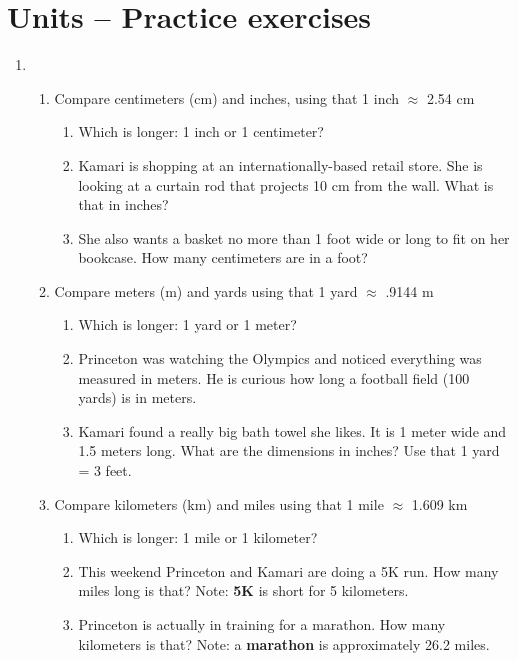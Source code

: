 
\section{Units  -- Practice exercises}

\begin{enumerate}
\item  
\begin{enumerate}

\item Compare centimeters (cm) and inches, using that 1 inch $\approx$ 2.54 cm
\begin{enumerate}
\item Which is longer:  1 inch or 1 centimeter? \vfill
\item Kamari is shopping at an internationally-based retail store. She is looking at a curtain rod that projects 10 cm from the wall.  What is that in inches?  \vfill
\item She also wants a basket no more than 1 foot wide or long to fit on her bookcase.  How many centimeters are in a foot? \vfill
\end{enumerate}

\item Compare meters (m) and yards using that 1 yard $\approx$ .9144 m
\begin{enumerate}
\item Which is longer: 1 yard or 1 meter? \vfill
\item Princeton was watching the Olympics and noticed everything was measured in meters.  He is curious how long a football field (100 yards) is in meters.  \vfill
\item Kamari found a really big bath towel she likes. It is 1 meter wide and 1.5 meters long.  What are the dimensions in inches?  Use that 1 yard = 3 feet.  \vfill \vfill
\end{enumerate}

\item Compare kilometers (km) and miles using that 1 mile $\approx$ 1.609 km
\begin{enumerate}
\item Which is longer:  1 mile or 1 kilometer? \vfill
\item This weekend Princeton and Kamari are doing a 5K run.  How many miles long is that?  Note:  \textbf{5K} is short for 5 kilometers.  \vfill
\item  Princeton is actually in training for a marathon.  How many kilometers is that?  Note: a \textbf{marathon} is approximately 26.2 miles. \vfill
\end{enumerate}


\end{enumerate}
\end{enumerate}
